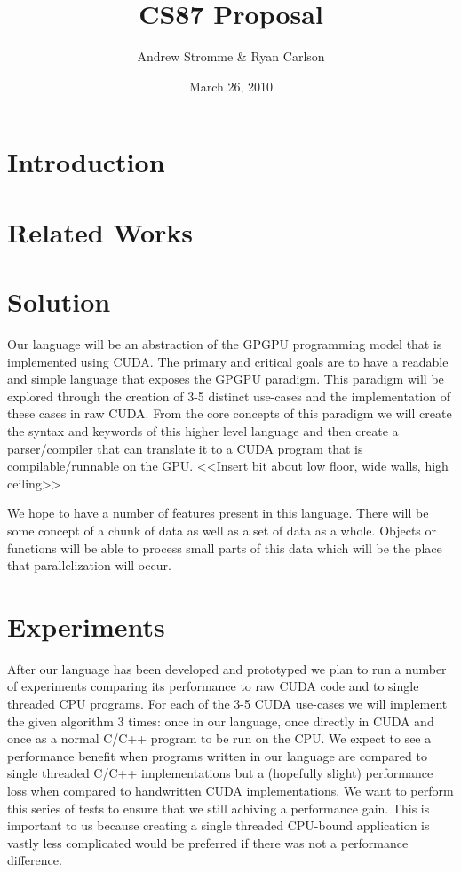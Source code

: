\documentclass{article}
\begin{document}
\title{CS87 Proposal}
\author{Andrew Stromme \& Ryan Carlson}
\date{March 26, 2010}
\maketitle

\section{Introduction}

\section{Related Works}

\section{Solution}
Our language will be an abstraction of the GPGPU programming model that is implemented using CUDA. The primary and critical goals are to have a readable and simple language that exposes the GPGPU paradigm. This paradigm will be explored through the creation of 3-5 distinct use-cases and the implementation of these cases in raw CUDA. From the core concepts of this paradigm we will create the syntax and keywords of this higher level language and then create a parser/compiler that can translate it to a CUDA program that is compilable/runnable on the GPU. <<Insert bit about low floor, wide walls, high ceiling>>

We hope to have a number of features present in this language. There will be some concept of a chunk of data as well as a set of data as a whole. Objects or functions will be able to process small parts of this data which will be the place that parallelization will occur. 


\section{Experiments}
After our language has been developed and prototyped we plan to run a number of experiments comparing its performance to raw CUDA code and to single threaded CPU programs. For each of the 3-5 CUDA use-cases we will implement the given algorithm 3 times: once in our language, once directly in CUDA and once as a normal C/C++ program to be run on the CPU. We expect to see a performance benefit when programs written in our language are compared to single threaded C/C++ implementations but a (hopefully slight) performance loss when compared to handwritten CUDA implementations. We want to perform this series of tests to ensure that we still achiving a performance gain. This is important to us because creating a single threaded CPU-bound application is vastly less complicated would be preferred if there was not a performance difference.
\end{document}
